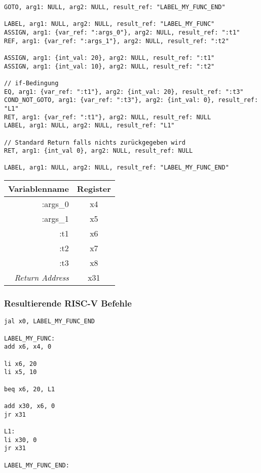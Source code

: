 \begin{lstlisting}[caption={Drei-Adressen Code Funktionsdeklaration}]
GOTO, arg1: NULL, arg2: NULL, result_ref: "LABEL_MY_FUNC_END"

LABEL, arg1: NULL, arg2: NULL, result_ref: "LABEL_MY_FUNC"
ASSIGN, arg1: {var_ref: ":args_0"}, arg2: NULL, result_ref: ":t1"
REF, arg1: {var_ref: ":args_1"}, arg2: NULL, result_ref: ":t2"

ASSIGN, arg1: {int_val: 20}, arg2: NULL, result_ref: ":t1"
ASSIGN, arg1: {int_val: 10}, arg2: NULL, result_ref: ":t2"

// if-Bedingung
EQ, arg1: {var_ref: ":t1"}, arg2: {int_val: 20}, result_ref: ":t3"
COND_NOT_GOTO, arg1: {var_ref: ":t3"}, arg2: {int_val: 0}, result_ref: "L1"
RET, arg1: {var_ref: ":t1"}, arg2: NULL, result_ref: NULL
LABEL, arg1: NULL, arg2: NULL, result_ref: "L1"

// Standard Return falls nichts zurückgegeben wird
RET, arg1: {int_val 0}, arg2: NULL, result_ref: NULL

LABEL, arg1: NULL, arg2: NULL, result_ref: "LABEL_MY_FUNC_END"
\end{lstlisting}

\begin{table}[H]
  \begin{center}
    \begin{tabular}{| r | c |}
      \hline
      Variablenname & Register \\
      \hline
      :args\_0 & x4 \\
      :args\_1 & x5 \\
      :t1 & x6 \\
      :t2 & x7 \\
      :t3 & x8 \\
      \textit{Return Address} & x31 \\
      \hline
    \end{tabular}
  \end{center}
\end{table}

\subsubsection{Resultierende RISC-V Befehle}

\begin{lstlisting}
jal x0, LABEL_MY_FUNC_END

LABEL_MY_FUNC:
add x6, x4, 0

li x6, 20
li x5, 10

beq x6, 20, L1

add x30, x6, 0
jr x31

L1:
li x30, 0
jr x31

LABEL_MY_FUNC_END:
\end{lstlisting}
